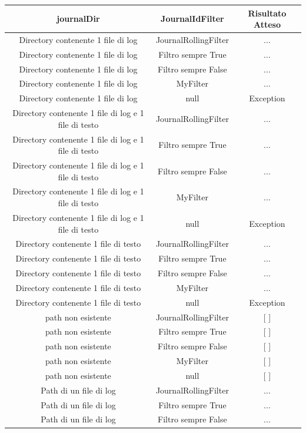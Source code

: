 \documentclass[12pt, a4paper]{article}
\begin{document}
\begin{table}[ht]
  \centering
  \begin{tabular}{|c|c|c|}
  \hline
  journalDir & JournalIdFilter & Risultato Atteso \\
  \hline
  {Directory contenente 1 file di log} & JournalRollingFilter & ... \\
  {Directory contenente 1 file di log} & Filtro sempre True & ... \\
  {Directory contenente 1 file di log} & Filtro sempre False & ... \\
  {Directory contenente 1 file di log} & MyFilter & ... \\
  {Directory contenente 1 file di log} & null & Exception \\
  {Directory contenente 1 file di log e 1 file di testo} & JournalRollingFilter & ... \\
  {Directory contenente 1 file di log e 1 file di testo} & Filtro sempre True & ... \\
  {Directory contenente 1 file di log e 1 file di testo} & Filtro sempre False & ... \\
  {Directory contenente 1 file di log e 1 file di testo} & MyFilter & ... \\
  {Directory contenente 1 file di log e 1 file di testo} & null & Exception \\
  {Directory contenente 1 file di testo} & JournalRollingFilter & ... \\
  {Directory contenente 1 file di testo} & Filtro sempre True & ... \\
  {Directory contenente 1 file di testo} & Filtro sempre False & ... \\
  {Directory contenente 1 file di testo} & MyFilter & ... \\
  {Directory contenente 1 file di testo} & null & Exception \\
  {path non esistente} & JournalRollingFilter & [ ] \\
  {path non esistente} & Filtro sempre True & [ ] \\
  {path non esistente} & Filtro sempre False & [ ] \\
  {path non esistente} & MyFilter & [ ] \\
  {path non esistente} & null & [ ] \\
  {Path di un file di log} & JournalRollingFilter & ... \\
  {Path di un file di log} & Filtro sempre True & ... \\
  {Path di un file di log} & Filtro sempre False & ... \\

\end{tabular}
\end{table}
\end{document}
